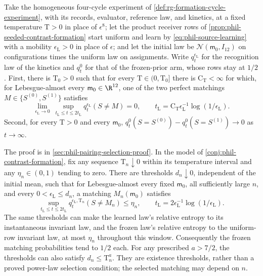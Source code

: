 Take the homogeneous four-cycle experiment of
\cref{def:rg-formation-cycle-experiment}, with its records, evaluator, reference
law, and kinetics, at a fixed temperature \(\mathrm T>0\) in place of
\(\epsilon^8\); let the product receiver rows of
\cref{prop:phil-seeded-contrast-formation} start uniform and learn by
\cref{eq:phil-source-learning} with a mobility \(\epsilon_{\mathrm L}>0\) in
place of \(\epsilon\); and let the initial law be
\(\mathcal N(\mathsf m_0,I_{12})\) on configurations times the uniform law on
assignments. Write \(q^{\epsilon_{\mathrm L}}_t\) for the recognition law of the
kinetics and \(q^0_t\) for that of the frozen-prior arm, whose rows stay at
\(1/2\). First, there is \(\mathrm T_0>0\) such
that for every \(\mathrm T\in(0,\mathrm T_0]\) there is
\(\mathrm C_{\mathrm T}<\infty\) for which, for Lebesgue-almost every
\(\mathsf m_0\in\R^{12}\), one of the two perfect matchings
\(M\in\{S^{(0)},S^{(1)}\}\) satisfies
\[
\lim_{\epsilon_{\mathrm L}\to0}\ \sup_{t_{\mathrm L}\le t\le2t_{\mathrm L}}
q^{\epsilon_{\mathrm L}}_t(S\ne M)=0,
\qquad
t_{\mathrm L}=\mathrm C_{\mathrm T}\epsilon_{\mathrm L}^{-1}\log(1/\epsilon_{\mathrm L}).
\]
Second, for every \(\mathrm T>0\) and every \(\mathsf m_0\),
\(q^0_t(S=S^{(0)})-q^0_t(S=S^{(1)})\to0\) as \(t\to\infty\).

The proof is in \cref{sec:phil-pairing-selection-proof}.
In the model of \cref{conj:phil-contrast-formation}, fix any sequence
\(\mathrm T_n\downarrow0\) within its temperature interval and any
\(\eta_n\in(0,1)\) tending to zero. There are thresholds \(d_n\downarrow0\), independent
of the initial mean, such that for Lebesgue-almost every fixed
\(\mathsf m_0\), all sufficiently large \(n\), and every
\(0<\epsilon_{\mathrm L}\le d_n\), a matching \(M_n(\mathsf m_0)\) satisfies
\[
 \sup_{t_{\mathrm L}\le t\le2t_{\mathrm L}}
 q_t^{\epsilon_{\mathrm L},\mathrm T_n}(S\ne M_n)\le\eta_n,
 \qquad t_{\mathrm L}=2\epsilon_{\mathrm L}^{-1}\log(1/\epsilon_{\mathrm L}).
\]
The same thresholds can make the learned law's relative entropy to its
instantaneous invariant law, and the frozen law's relative entropy to the
uniform-row invariant law, at most \(\eta_n\) throughout this window.
Consequently the frozen matching probabilities tend to \(1/2\) each.
For any prescribed \(a>7/2\), the thresholds can also satisfy
\(d_n\le\mathrm T_n^a\). They are existence thresholds, rather than a
proved power-law selection condition; the selected matching may depend on
\(n\).

